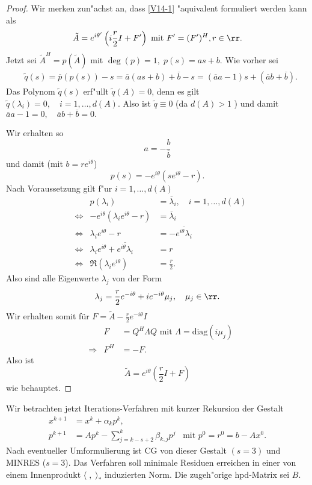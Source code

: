 \begin{proof}
Wir merken zun"achst an, dass \eqref{V14-1} "aquivalent formuliert werden kann als
  \[
   \tilde{A}=e^{i\theta'} \left( i \frac{r}{2}I+F' \right) \text{ mit } F'=(F')^H, r\in \rr.
  \]
 Jetzt sei $\tilde{A}^H=p(\tilde{A})$ mit $\deg{(p)}=1,\; p(s)=as +b$.
 Wie vorher sei
  \begin{align*}
   &\tilde{q}(s) = \overline{p}(p(s))-s=\overline{a}(as+b)+\overline{b}-s=(\overline{a}a-1)s+(\overline{a}b+\overline{b}). 
  \end{align*}
 Das Polynom $\tilde{q}(s)$ erf"ullt $\tilde{q}(A)=0$, denn es gilt $\tilde{q}(\lambda_i)=0,\quad i=1,\dots,d(A) $.  Also ist $\tilde{q}\equiv 0$ (da $d(A)>1$ )
und damit $\overline{a}a-1=0, \quad \overline{a}b+\overline{b}=0.$ 

 Wir erhalten so
\[
 a=-\frac{b}{\overline{b}}
\]
 und damit (mit $b=re^{i\theta}$)
\[
 p(s)=-e^{i\theta}\left( se^{i\theta}-r \right).
\]
 Nach Voraussetzung gilt f"ur $i=1,\ldots,d(A)$
  \begin{align*}
   && p(\lambda_i)  &=\overline{\lambda}_i, \quad i=1,\dots,d(A)\\
   &\Longleftrightarrow & -e^{i\theta}\left(\lambda_i e^{i\theta}-r \right)&=\overline{\lambda}_i \\
   &\Longleftrightarrow & \lambda_i e^{i\theta}-r &=-\overline{e^{i\theta}\lambda_i} \\
   &\Longleftrightarrow & \lambda_i e^{i\theta}+\overline{e^{i\theta}\lambda_i} &= r \\
   &\Longleftrightarrow & \Re(\lambda_i e^{i\theta}) &= \frac{r}{2}.  \end{align*}
 Also sind alle Eigenwerte $\lambda_j$ von der Form
  \begin{align*}
   && \lambda_j & =\frac{r}{2}e^{-i\theta}+ie^{-i\theta}\mu_j,\quad \mu_j \in \rr.
 \end{align*} 
Wir erhalten somit f\"ur $F = \tilde{A} - \frac{r}{2}e^{-i\theta}I$
  \begin{align*}
   && F &= Q^H \Lambda Q \text{  mit } \Lambda=\text{diag}(i\mu_j) \\
   &\Longrightarrow & F^H &= -F.
  \end{align*}
 Also ist
\[
 \tilde{A}=e^{i\theta}\left(  \frac{r}{2}I+F\right)
\]
 wie behauptet.
\end{proof}

\bigskip

Wir betrachten jetzt Iterations-Verfahren mit kurzer Rekursion der Gestalt
\begin{align}
 x^{k+1} &= x^k+\alpha_k p^k, \label{V14-2}\\
 p^{k+1} &= Ap^k-\sum_{j=k-s+2}^{k}{\beta_{k,j}p^j} \enspace  \text{ mit } p^0  =r^0=b-Ax^0. \label{V14-3} 
\end{align}
 Nach eventueller Umformulierung ist CG von dieser Gestalt $(s=3)$ und MINRES ($s=3$). 
 Das Verfahren soll minimale Residuen erreichen in einer von einem Innenprodukt $\langle \; , \; \rangle_*$ induzierten Norm.
 Die zugeh"orige hpd-Matrix sei $B$.  

